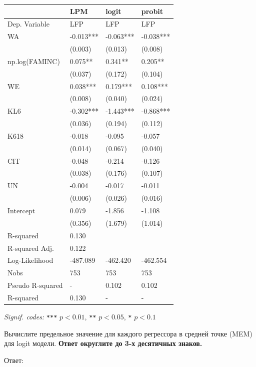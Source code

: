 \documentclass[
  russian,
]{article}
\newcounter{none} %
\begin{document}
{\def\LTcaptype{none} %
\begin{longtable}[]{@{}llll@{}}
\toprule\noalign{}
& LPM & logit & probit \\
\midrule\noalign{}
\endhead
\bottomrule\noalign{}
\endlastfoot
Dep. Variable & LFP & LFP & LFP \\
WA & -0.013*** & -0.063*** & -0.038*** \\
& (0.003) & (0.013) & (0.008) \\
np.log(FAMINC) & 0.075** & 0.341** & 0.205** \\
& (0.037) & (0.172) & (0.104) \\
WE & 0.038*** & 0.179*** & 0.108*** \\
& (0.008) & (0.040) & (0.024) \\
KL6 & -0.302*** & -1.443*** & -0.868*** \\
& (0.036) & (0.194) & (0.112) \\
K618 & -0.018 & -0.095 & -0.057 \\
& (0.014) & (0.067) & (0.040) \\
CIT & -0.048 & -0.214 & -0.126 \\
& (0.038) & (0.176) & (0.107) \\
UN & -0.004 & -0.017 & -0.011 \\
& (0.006) & (0.026) & (0.016) \\
Intercept & 0.079 & -1.856 & -1.108 \\
& (0.356) & (1.679) & (1.014) \\
R-squared & 0.130 & & \\
R-squared Adj. & 0.122 & & \\
Log-Likelihood & -487.089 & -462.420 & -462.554 \\
Nobs & 753 & 753 & 753 \\
Pseudo R-squared & - & 0.102 & 0.102 \\
R-squared & 0.130 & - & - \\
\end{longtable}
}

\emph{Signif. codes:} \texttt{***} \(p<0.01\), \texttt{**} \(p<0.05\),
\texttt{*} \(p<0.1\)

Вычислите предельное значение для каждого регрессора в средней точке
(MEM) для logit модели. \textbf{Ответ округлите до 3-х десятичных
знаков.}

Ответ:
\end{document}
